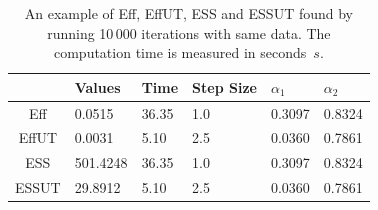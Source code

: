 \begin{table}[h]
\centering
\caption{An example of Eff, EffUT, ESS and ESSUT found by running 10\,000 iterations with same data. The computation time is measured in seconds~$s$. }
\label{effeutessessutexampletable}
\begin{tabular}{|c|C{2cm}|C{2cm}|C{2cm}|C{2cm}|C{2cm}|}
\hline
          & Values     & Time & Step Size & $\alpha_1$ & $\alpha_2$ \\ \hline
Eff      & 0.0515     & 36.35 & 1.0   & 0.3097    & 0.8324    \\ \hline
EffUT  & 0.0031     & 5.10   & 2.5   & 0.0360   & 0.7861   \\ \hline
ESS     & 501.4248 & 36.35 & 1.0   & 0.3097    & 0.8324     \\ \hline
ESSUT & 29.8912   & 5.10   & 2.5   & 0.0360   & 0.7861    \\ \hline
\end{tabular}
\end{table}
